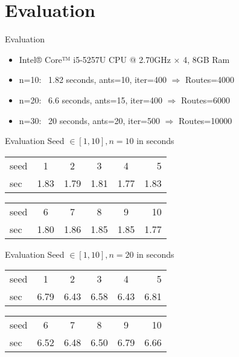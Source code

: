 \documentclass{ocbeameruni}
\begin{document}
\section{Evaluation}

\begin{frame}{Evaluation}
    \begin{itemize}
    \item Intel® Core™ i5-5257U CPU @ 2.70GHz × 4, 8GB Ram
    \item n=10: ~1.82 seconds, ants=10, iter=400 $\Rightarrow$ Routes=4000
    \item n=20: ~6.6 seconds, ants=15, iter=400 $\Rightarrow$ Routes=6000
    \item n=30: ~20 seconds, ants=20, iter=500 $\Rightarrow$ Routes=10000
    \end{itemize}
\end{frame}


\begin{frame}{Evaluation Seed $\in [1,10], n=10$ in seconds}
\begin{center}
\begin{tabular}{ l | c | c |c |c |r }
   seed & 1 & 2 & 3 & 4 & 5 \\
   sec & 1.83 & 1.79 & 1.81 & 1.77 & 1.83 \\
\end{tabular}
\end{center}
\begin{center}
\begin{tabular}{ l | c | c |c |c |r }
   seed & 6 & 7 & 8 & 9 & 10  \\
   sec & 1.80 & 1.86 & 1.85 & 1.85 & 1.77 \\
\end{tabular}
\end{center}
\end{frame}

\begin{frame}{Evaluation Seed $\in [1,10], n=20$ in seconds}
\begin{center}
\begin{tabular}{ l | c | c |c |c |r }
   seed & 1 & 2 & 3 & 4 & 5  \\
   sec & 6.79 & 6.43 & 6.58 & 6.43 & 6.81 \\
\end{tabular}
\end{center}
\begin{center}
\begin{tabular}{ l | c | c |c |c |r }
   seed & 6 & 7 & 8 & 9 & 10  \\
   sec & 6.52 & 6.48 & 6.50 & 6.79 & 6.66 \\
\end{tabular}
\end{center}
\end{frame}
\end{document}
